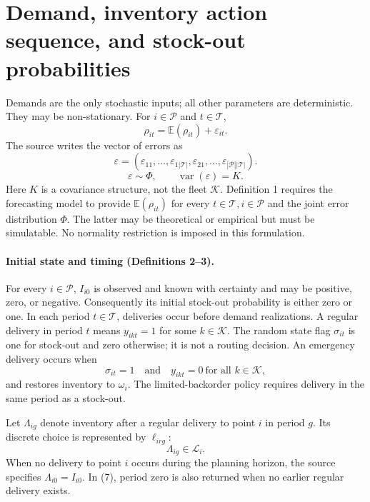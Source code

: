 \documentclass[10pt]{article}
\begin{document}
\section*{Demand, inventory action sequence, and stock-out probabilities}
Demands are the only stochastic inputs; all other parameters are deterministic. They may be non-stationary. For $i\in\mathcal P$ and $t\in\mathcal T$,
\begin{equation}
\rho_{it}=\mathbb E(\rho_{it})+\varepsilon_{it}.
\tag{1}
\end{equation}
The source writes the vector of errors as
\begin{equation}
\varepsilon=(\varepsilon_{11},\ldots,\varepsilon_{1|\mathcal T|},\varepsilon_{21},\ldots,\varepsilon_{|\mathcal P||\mathcal T|}).
\tag{2}
\end{equation}
\[
\varepsilon\sim\Phi,\qquad\operatorname{var}(\varepsilon)=K.
\]
Here $K$ is a covariance structure, not the fleet $\mathcal K$. Definition 1 requires the forecasting model to provide $\mathbb E(\rho_{it})$ for every $t\in\mathcal T,i\in\mathcal P$ and the joint error distribution $\Phi$. The latter may be theoretical or empirical but must be simulatable. No normality restriction is imposed in this formulation.

\paragraph{Initial state and timing (Definitions 2--3).}
For every $i\in\mathcal P$, $I_{i0}$ is observed and known with certainty and may be positive, zero, or negative. Consequently its initial stock-out probability is either zero or one. In each period $t\in\mathcal T$, deliveries occur before demand realizations. A regular delivery in period $t$ means $y_{ikt}=1$ for some $k\in\mathcal K$. The random state flag $\sigma_{it}$ is one for stock-out and zero otherwise; it is not a routing decision. An emergency delivery occurs when
\[
\sigma_{it}=1\quad\text{and}\quad y_{ikt}=0\ \text{for all }k\in\mathcal K,
\]
and restores inventory to $\omega_i$. The limited-backorder policy requires delivery in the same period as a stock-out.

Let $\Lambda_{ig}$ denote inventory after a regular delivery to point $i$ in period $g$. Its discrete choice is represented by $\ell_{irg}$:
\[
\Lambda_{ig}\in\mathcal L_i.
\]
When no delivery to point $i$ occurs during the planning horizon, the source specifies $\Lambda_{i0}=I_{i0}$. In (7), period zero is also returned when no earlier regular delivery exists.
\end{document}
